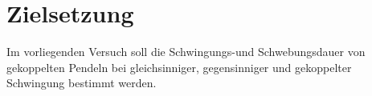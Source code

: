 \section{Zielsetzung}
\label{sec:Zielsetzung}
Im vorliegenden Versuch soll die Schwingungs-und Schwebungsdauer von gekoppelten Pendeln bei gleichsinniger, gegensinniger und gekoppelter Schwingung bestimmt werden.
 

